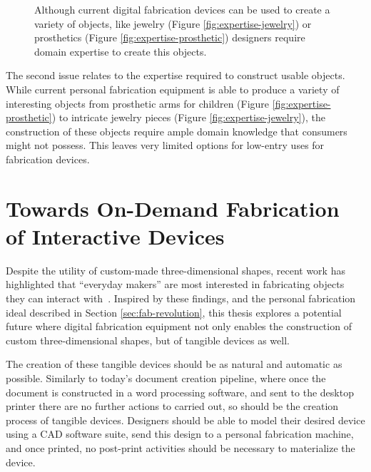     \begin{figure}[h]
      \centering
      \label{}

      \caption{Although current digital fabrication devices can be used to
        create a variety of objects, like jewelry (Figure
        \ref{fig:expertise-jewelry}) or prosthetics (Figure
        \ref{fig:expertise-prosthetic}) designers require domain expertise to
        create this objects.}
    \end{figure}

    The second issue relates to the expertise required to construct usable
    objects. While current personal fabrication equipment is able to produce a
    variety of interesting objects from prosthetic arms for children (Figure
    \ref{fig:expertise-prosthetic}) to intricate jewelry pieces (Figure
    \ref{fig:expertise-jewelry}), the construction of these objects require
    ample domain knowledge that consumers might not possess.  This leaves very
    limited options for low-entry uses for fabrication devices.

  \section{Towards On-Demand Fabrication of Interactive Devices} \label{sec:on-demand}
    Despite the utility of custom-made three-dimensional shapes, recent work has
    highlighted that ``everyday makers'' are most interested in fabricating
    objects they can interact with~\cite{Shewbridge:2014}. Inspired by these
    findings, and the personal fabrication ideal described in Section
    \ref{sec:fab-revolution}, this thesis explores a potential future where
    digital fabrication equipment not only enables the construction of custom
    three-dimensional shapes, but of tangible devices as well.

    The creation of these tangible devices should be as natural and automatic as
    possible. Similarly to today's document creation pipeline, where once the
    document is constructed in a word processing software, and sent to the
    desktop printer there are no further actions to carried out, so should be
    the creation process of tangible devices. Designers should be able to model
    their desired device using a CAD software suite, send this design to a
    personal fabrication machine, and once printed, no post-print activities
    should be necessary to materialize the device.

